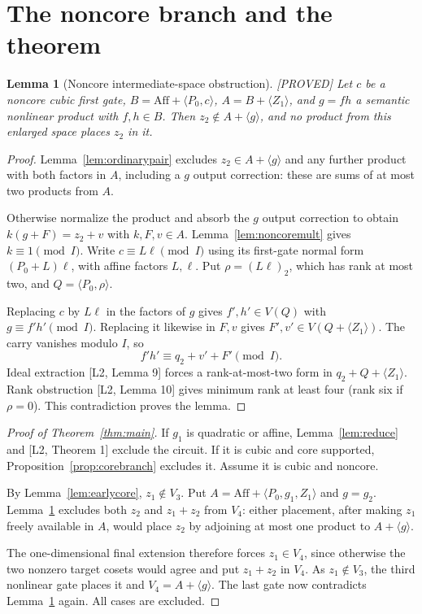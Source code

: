 \documentclass[11pt,a4paper]{article}
\newtheorem{lemma}[theorem]{Lemma}
\newcommand{\Aff}{\mathrm{Aff}}
\newcommand{\status}[1]{\hfill\textsf{[#1]}}
\begin{document}
\section{The noncore branch and the theorem}
\begin{lemma}[Noncore intermediate-space obstruction]\label{lem:noncore}\status{PROVED}
Let $c$ be a noncore cubic first gate, $B=\Aff+\langle P_0,c\rangle$, $A=B+\langle Z_1\rangle$, and $g=fh$ a semantic nonlinear product with $f,h\in B$. Then $z_2\notin A+\langle g\rangle$, and no product from this enlarged space places $z_2$ in it.
\end{lemma}
\begin{proof}
Lemma~\ref{lem:ordinarypair} excludes $z_2\in A+\langle g\rangle$ and any further product with both factors in $A$, including a $g$ output correction: these are sums of at most two products from $A$.

Otherwise normalize the product and absorb the $g$ output correction to obtain $k(g+F)=z_2+v$ with $k,F,v\in A$. Lemma~\ref{lem:noncoremult} gives $k\equiv1\pmod I$. Write $c\equiv L\ell\pmod I$ using its first-gate normal form $(P_0+L)\ell$, with affine factors $L,\ell$. Put $\rho=(L\ell)_2$, which has rank at most two, and $Q=\langle P_0,\rho\rangle$.

Replacing $c$ by $L\ell$ in the factors of $g$ gives $f',h'\in V(Q)$ with $g\equiv f'h'\pmod I$. Replacing it likewise in $F,v$ gives $F',v'\in V(Q+\langle Z_1\rangle)$. The carry vanishes modulo $I$, so
\[
f'h'\equiv q_2+v'+F'\pmod I.
\]
Ideal extraction [L2, Lemma 9] forces a rank-at-most-two form in $q_2+Q+\langle Z_1\rangle$. Rank obstruction [L2, Lemma 10] gives minimum rank at least four (rank six if $\rho=0$). This contradiction proves the lemma.
\end{proof}

\begin{proof}[Proof of Theorem~\ref{thm:main}]
If $g_1$ is quadratic or affine, Lemma~\ref{lem:reduce} and [L2, Theorem 1] exclude the circuit. If it is cubic and core supported, Proposition~\ref{prop:corebranch} excludes it. Assume it is cubic and noncore.

By Lemma~\ref{lem:earlycore}, $z_1\notin V_3$. Put $A=\Aff+\langle P_0,g_1,Z_1\rangle$ and $g=g_2$. Lemma~\ref{lem:noncore} excludes both $z_2$ and $z_1+z_2$ from $V_4$: either placement, after making $z_1$ freely available in $A$, would place $z_2$ by adjoining at most one product to $A+\langle g\rangle$.

The one-dimensional final extension therefore forces $z_1\in V_4$, since otherwise the two nonzero target cosets would agree and put $z_1+z_2$ in $V_4$. As $z_1\notin V_3$, the third nonlinear gate places it and $V_4=A+\langle g\rangle$. The last gate now contradicts Lemma~\ref{lem:noncore} again. All cases are excluded.
\end{proof}
\end{document}
